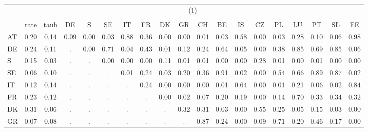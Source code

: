 {
\def\sym#1{\ifmmode^{#1}\else\(^{#1}\)\fi}
\begin{tabular}{l*{1}{cccccccccccccccccc}}
\hline\hline
          &\multicolumn{18}{c}{(1)}                                                                                                                                                           \\
          &\multicolumn{18}{c}{}                                                                                                                                                              \\
          &     rate&     taub&       DE&        S&       SE&       IT&       FR&       DK&       GR&       CH&       BE&       IS&       CZ&       PL&       LU&       PT&       SL&       EE\\
\hline
AT        &     0.20&     0.14&     0.09&     0.00&     0.03&     0.88&     0.36&     0.00&     0.00&     0.01&     0.03&     0.58&     0.00&     0.03&     0.28&     0.10&     0.06&     0.98\\
DE        &     0.24&     0.11&        .&     0.00&     0.71&     0.04&     0.43&     0.01&     0.12&     0.24&     0.64&     0.05&     0.00&     0.38&     0.85&     0.69&     0.85&     0.06\\
S         &     0.15&     0.03&        .&        .&     0.00&     0.00&     0.00&     0.11&     0.01&     0.01&     0.00&     0.00&     0.28&     0.01&     0.00&     0.01&     0.00&     0.00\\
SE        &     0.06&     0.10&        .&        .&        .&     0.01&     0.24&     0.03&     0.20&     0.36&     0.91&     0.02&     0.00&     0.54&     0.66&     0.89&     0.87&     0.02\\
IT        &     0.12&     0.14&        .&        .&        .&        .&     0.24&     0.00&     0.00&     0.00&     0.01&     0.64&     0.00&     0.01&     0.21&     0.06&     0.02&     0.84\\
FR        &     0.23&     0.12&        .&        .&        .&        .&        .&     0.00&     0.02&     0.07&     0.20&     0.19&     0.00&     0.14&     0.70&     0.33&     0.34&     0.32\\
DK        &     0.31&     0.06&        .&        .&        .&        .&        .&        .&     0.32&     0.31&     0.03&     0.00&     0.55&     0.25&     0.05&     0.15&     0.03&     0.00\\
GR        &     0.07&     0.08&        .&        .&        .&        .&        .&        .&        .&     0.87&     0.24&     0.00&     0.09&     0.71&     0.20&     0.46&     0.17&     0.00\\

\end{tabular}}
